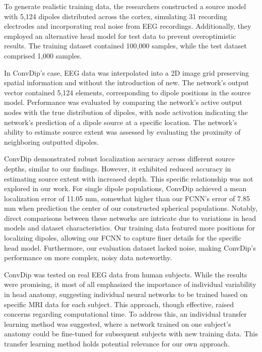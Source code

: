 \documentclass[a4paper, UKenglish, 11pt]{uiomaster}
\begin{document}
To generate realistic training data, the researchers constructed a source model with 5,124 dipoles distributed across the cortex, simulating 31 recording electrodes and incorporating real noise from EEG recordings. Additionally, they employed an alternative head model for test data to prevent overoptimistic results. The training dataset contained 100,000 samples, while the test dataset comprised 1,000 samples.

In ConvDip's case, EEG data was interpolated into a 2D image grid preserving spatial information and without the introduction of new. The network's output vector contained 5,124 elements, corresponding to dipole positions in the source model. Performance was evaluated by comparing the network's active output nodes with the true distribution of dipoles, with node activation indicating the network's prediction of a dipole source at a specific location. The network's ability to estimate source extent was assessed by evaluating the proximity of neighboring outputted dipoles.

ConvDip demonstrated robust localization accuracy across different source depths, similar to our findings. However, it exhibited reduced accuracy in estimating source extent with increased depth. This specific relationship was not explored in our work. For single dipole populations, ConvDip achieved a mean localization error of 11.05 mm, somewhat higher than our FCNN's error of 7.85 mm when prediction the center of our constructed spherical populations. Notably, direct comparisons between these networks are intricate due to variations in head models and dataset characteristics. Our training data featured more positions for localizing dipoles, allowing our FCNN to capture finer details for the specific head model. Furthermore, our evaluation dataset lacked noise, making ConvDip's performance on more complex, noisy data noteworthy.

ConvDip was tested on real EEG data from human subjects. While the results were promising, it most of all emphasized the importance of individual variability in head anatomy, suggesting individual neural networks to be trained based on specific MRI data for each subject. This approach, though effective, raised concerns regarding computational time. To address this, an individual transfer learning method was suggested, where a network trained on one subject's anatomy could be fine-tuned for subsequent subjects with new training data. This transfer learning method holds potential relevance for our own approach.
\end{document}
